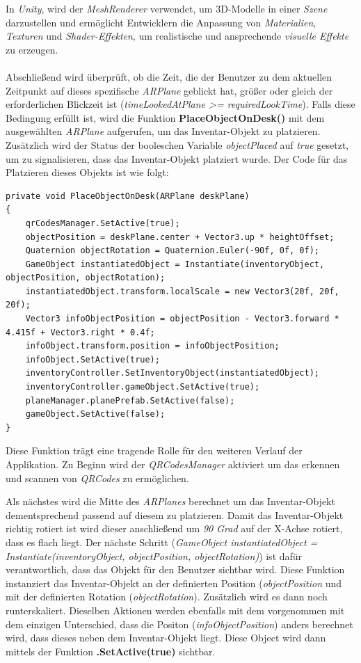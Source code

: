 In \textit{Unity}, wird der \textit{MeshRenderer} verwendet, um 3D-Modelle in einer \textit{Szene} darzustellen und ermöglicht
Entwicklern die Anpassung von \textit{Materialien}, \textit{Texturen} und \textit{Shader-Effekten}, um realistische und
ansprechende \textit{visuelle Effekte} zu erzeugen.\\
\\
Abschließend wird überprüft, ob die Zeit, die der Benutzer zu dem aktuellen Zeitpunkt auf dieses spezifische \textit{ARPlane}
geblickt hat, größer oder gleich der erforderlichen Blickzeit ist (\textit{timeLookedAtPlane >= requiredLookTime}). Falls
diese Bedingung erfüllt ist, wird die Funktion \textbf{PlaceObjectOnDesk()} mit dem ausgewählten \textit{ARPlane} aufgerufen,
um das Inventar-Objekt zu platzieren. Zusätzlich wird der Status der booleschen Variable \textit{objectPlaced} auf \textit{true}
gesetzt, um zu signalisieren, dass das Inventar-Objekt platziert wurde. Der Code für das Platzieren dieses Objekts ist wie folgt:
\begin{lstlisting}[caption={Inventar-Objekt platzieren}, label=code:placeObject]
private void PlaceObjectOnDesk(ARPlane deskPlane)
{
    qrCodesManager.SetActive(true);
    objectPosition = deskPlane.center + Vector3.up * heightOffset;
    Quaternion objectRotation = Quaternion.Euler(-90f, 0f, 0f);
    GameObject instantiatedObject = Instantiate(inventoryObject, objectPosition, objectRotation);
    instantiatedObject.transform.localScale = new Vector3(20f, 20f, 20f);
    Vector3 infoObjectPosition = objectPosition - Vector3.forward * 4.415f + Vector3.right * 0.4f;
    infoObject.transform.position = infoObjectPosition;
    infoObject.SetActive(true);
    inventoryController.SetInventoryObject(instantiatedObject);
    inventoryController.gameObject.SetActive(true);
    planeManager.planePrefab.SetActive(false);
    gameObject.SetActive(false);
}
\end{lstlisting}
Diese Funktion trägt eine tragende Rolle für den weiteren Verlauf der Applikation. Zu Beginn wird der \textit{QRCodesManager}
aktiviert um das erkennen und scannen von \textit{QRCodes} zu ermöglichen.

Als nächstes wird die Mitte des \textit{ARPlanes} berechnet um das Inventar-Objekt dementsprechend passend auf diesem zu
platzieren. Damit das Inventar-Objekt richtig rotiert ist wird dieser anschließend um \textit{90 Grad} auf der X-Achse
rotiert, dass es flach liegt. Der nächste Schritt
(\textit{GameObject instantiatedObject = Instantiate(inventoryObject, objectPosition, objectRotation)}) ist dafür
verantwortlich, dass das Objekt für den Benutzer sichtbar wird. Diese Funktion instanziert das Inventar-Objekt an der
definierten Position (\textit{objectPosition} und mit der definierten Rotation (\textit{objectRotation}). Zusätzlich wird
es dann noch runterskaliert. Dieselben Aktionen werden ebenfalls mit dem  vorgenommen mit dem einzigen
Unterschied, dass die Positon (\textit{infoObjectPosition}) anders berechnet wird, dass dieses neben dem Inventar-Objekt
liegt. Diese Object wird dann mittels der Funktion \textbf{.SetActive(true)} sichtbar.\\

